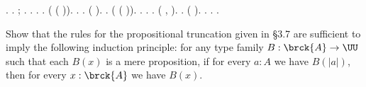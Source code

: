 \begin{coqdoccode}
\coqdocnoindent
{}.\coqdoceol
\coqdocindent{1.00em}
 .  ;  .\coqdoceol
\coqdocemptyline
\coqdocindent{1.00em}
 .  .  .\coqdoceol
\coqdocindent{1.00em}
 ( ( )).\coqdoceol
\coqdocindent{2.00em}
 .  .\coqdoceol
\coqdocindent{2.00em}
 ( ).\coqdoceol
\coqdocemptyline
\coqdocindent{1.00em}
 .\coqdoceol
\coqdocindent{1.00em}
 ( ( )).\coqdoceol
\coqdocindent{2.00em}
 .  . .\coqdoceol
\coqdocindent{2.00em}
 (\coqdocnotation{\ensuremath{\lnot}} \coqdocnotation{(}\coqdockw{\ensuremath{\forall}} ,  \coqdocnotation{)}).  .  ( ).\coqdoceol
\coqdocindent{2.00em}
.\coqdoceol
\coqdocnoindent
{}.\coqdoceol
\coqdocemptyline
\coqdocnoindent
{} .\coqdoceol
\coqdocemptyline
\end{coqdoccode}
Show that the rules for the propositional truncation given in \S3.7 are
sufficient to imply the following induction principle: for any type family $B :
\brck{A} \to \UU$ such that each $B(x)$ is a mere proposition, if for every
$a:A$ we have $B(\lvert a \rvert)$, then for every $x : \brck{A}$ we have
$B(x)$.



